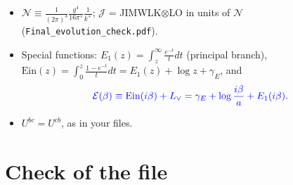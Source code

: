 \documentclass[10pt]{article}
\numberwithin{equation}{section}
\newcommand{\new}[1]{{\color{blue}#1}}
\newcommand{\Lv}{L_{\vee}}
\newcommand{\JJ}{\mathcal J}
\newcommand{\NN}{\mathcal N}
\newcommand{\EE}{\mathcal E}
\newcommand{\pre}{\frac{1}{(2\pi)^3}}
\begin{document}
\begin{itemize}
In ${\rm LO}[\ell_X]$, $X=x-y$ (the emission distance); $\Delta\equiv y'-y$.
\item $\NN\equiv\pre\frac{g^4}{16\pi^5}\frac{1}{k^+}$; $\JJ$ = JIMWLK$\otimes$LO in units of $\NN$ (\texttt{Final\_evolution\_check.pdf}).
\item Special functions: $E_1(z)=\int_z^\infty\frac{e^{-t}}{t}dt$ (principal branch), $\mathrm{Ein}(z)=\int_0^z\frac{1-e^{-t}}{t}dt=E_1(z)+\log z+\gamma_E$, and
\begin{equation*}
\new{\EE(\beta)\equiv\mathrm{Ein}(i\beta)+\Lv=\gamma_E+\log\frac{i\beta}{a}+E_1(i\beta).}
\end{equation*}
\item $U^{bc}=U^{cb}$, as in your files.
\end{itemize}

\section{Check of the file}\label{sec:check}
\end{document}
